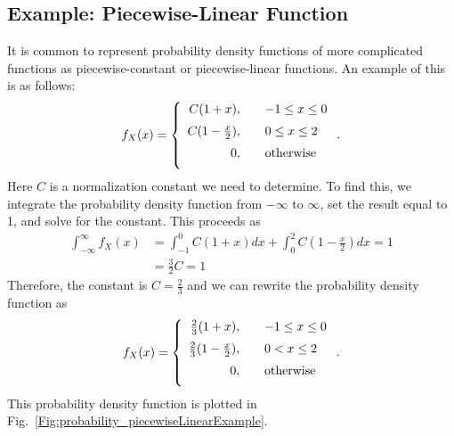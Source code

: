 \subsection{Example: Piecewise-Linear Function}

It is common to represent probability density functions of more complicated functions as piecewise-constant or piecewise-linear functions. An example of this is as follows:
\begin{align}
  f_X(x) = \left\{ \begin{array}{r l} 
    C ( 1 + x ),            & \quad -1 \le x \le 0 \vspace{0.2cm} \\
    C ( 1 - \tfrac{x}{2} ), & \quad  0 \le x \le 2 \vspace{0.2cm} \\
    0, & \quad \text{otherwise} \vspace{0.2cm} \\ \end{array} \right. .
\end{align}
Here $C$ is a normalization constant we need to determine. To find this, we integrate the probability density function from $-\infty$ to $\infty$, set the result equal to 1, and solve for the constant. This proceeds as
\begin{align}
  \int_{-\infty}^\infty f_X(x) &= \int_{-1}^0 C ( 1 + x ) dx + \int_0^2 C ( 1 - \tfrac{x}{2} ) dx = 1 \nonumber \\
  &= \frac{3}{2} C = 1
\end{align}
Therefore, the constant is $C = \tfrac{2}{3}$ and we can rewrite the probability density function as
\begin{align}
  f_X(x) = \left\{ \begin{array}{r l} 
    \tfrac{2}{3} ( 1 + x ),            & \quad -1 \le x \le 0 \vspace{0.2cm} \\
    \tfrac{2}{3} ( 1 - \tfrac{x}{2} ), & \quad  0 < x \le 2 \vspace{0.2cm} \\
    0, & \quad \text{otherwise} \vspace{0.2cm} \\ \end{array} \right. .
\end{align}
This probability density function is plotted in Fig.~\ref{Fig:probability_piecewiseLinearExample}.

